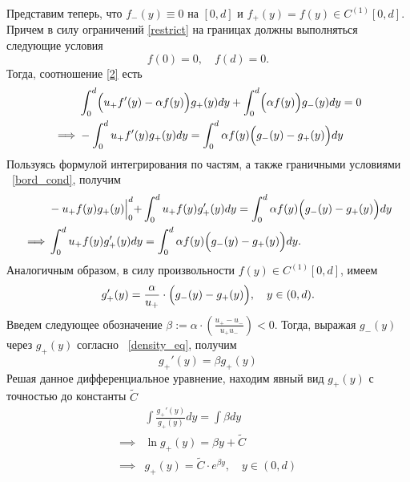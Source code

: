 \documentclass[12pt,a4paper]{article}
\begin{document}
Представим теперь, что $f_- (y) \equiv 0$ на $[0, d]$ и $f_+ (y) = f(y) \in C^{(1)} [0, d].$ Причем в силу ограничений \eqref{restrict} на границах должны выполняться следующие условия
\begin{equation}\label{bord_cond}
    f (0) = 0, \quad f(d) = 0.
\end{equation}
Тогда, соотношение \eqref{2} есть
\begin{equation*}
    \begin{aligned}
    &\int_0^d \Bigl( u_+ f' (y) - \alpha f (y) \Bigr) g_+(y) dy + \int_0^d \Bigl( \alpha f (y) \Bigr) g_- (y) dy = 0 \\
   \implies &- \int_0^d u_+ f' (y) g_+(y) dy = \int_0^d \alpha f (y) \Bigl( g_- (y) - g_+ (y)\Bigr) dy
    \end{aligned}
\end{equation*}
Пользуясь формулой интегрирования по частям, а также граничными условиями ~\eqref{bord_cond}, получим
\begin{equation*}
    \begin{aligned}
    &- u_+ f (y) g_+(y) \Bigl|_0^d + \int_0^d u_+ f (y) g_+'(y) dy = \int_0^d \alpha f (y) \Bigl( g_- (y) - g_+ (y)\Bigr) dy\\
    \implies & \int_0^d u_+ f (y) g_+'(y) dy = \int_0^d \alpha f (y) \Bigl( g_- (y) - g_+ (y)\Bigr) dy.
    \end{aligned}
\end{equation*}
Аналогичным образом, в силу произвольности $f (y) \in C^{(1)} [0, d]$, имеем
\begin{equation}\label{dif_eq_+}
    g_+' (y) = \frac{\alpha}{u_+} \cdot \Bigl( g_- (y) - g_+ (y) \Bigr), \quad y \in (0, d).
\end{equation}
Введем следующее обозначение $\beta := \alpha \cdot \left( \displaystyle\frac{u_+ - u_-}{u_+ u_-}\right) < 0$. Тогда, выражая $g_- (y)$ через $g_+ (y)$ согласно ~\eqref{density_eq}, получим 
$$ g_+' (y) = \beta g_+(y) $$
Решая данное дифференциальное уравнение, находим явный вид $g_+(y)$ с точностью до константы $\widetilde{C}$
\begin{equation*}
    \begin{aligned}
        &\int \frac{g_+' (y)}{g_+ (y)} dy = \int \beta dy\\
        \implies &\ln g_+(y) = \beta y + \widetilde{C}\\
        \implies &g_+ (y) = \widetilde{C} \cdot e^{\beta y}, \quad y \in (0, d)
    \end{aligned}
\end{equation*}
\end{document}
